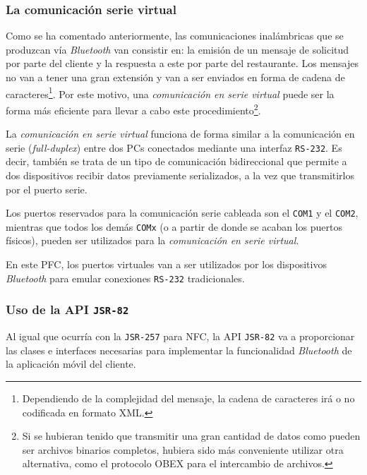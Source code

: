   \subsubsection{La comunicación serie virtual}
Como se ha comentado anteriormente, las comunicaciones inalámbricas que se 
produzcan vía \emph{Bluetooth} van consistir en: la emisión de un mensaje de 
solicitud por parte del cliente y la respuesta a este por parte del 
restaurante. Los mensajes no van a tener una gran extensión y van a ser 
enviados en forma de cadena de caracteres\footnote{Dependiendo de la 
complejidad del mensaje, la cadena de caracteres irá o no codificada en 
formato \acs{XML}.}. Por este motivo, una \emph{comunicación en serie virtual} 
puede ser la forma más eficiente para llevar a cabo este
procedimiento\footnote{Si se hubieran tenido que transmitir una gran cantidad
de datos como pueden ser archivos binarios completos, hubiera sido más 
conveniente utilizar otra alternativa, como el protocolo \acs{OBEX} para el 
intercambio de archivos.}.

La \emph{comunicación en serie virtual} funciona de forma similar a la
comunicación en serie (\emph{full-duplex}) entre dos PCs conectados 
mediante una interfaz \texttt{RS-232}. Es decir, también se trata de un
tipo de comunicación bidireccional que permite a dos dispositivos
recibir datos previamente serializados, a la vez que transmitirlos por el
puerto serie.

Los puertos reservados para la comunicación serie cableada son el \texttt{COM1}
y el \texttt{COM2}, mientras que todos los demás \texttt{COMx} (o a partir de
donde se acaban los puertos físicos), pueden ser utilizados para la 
\emph{comunicación en serie virtual}.

En este \acs{PFC}, los puertos virtuales van a ser utilizados por los
dispositivos \emph{Bluetooth} para emular conexiones \texttt{RS-232}
tradicionales.

  \subsubsection{Uso de la \acs{API} \texttt{\acs{JSR}-82}}
Al igual que ocurría con la \texttt{\acs{JSR}-257} para \acs{NFC}, la \acs{API}
\texttt{\acs{JSR}-82} va a proporcionar las clases e interfaces necesarias para
implementar la funcionalidad \emph{Bluetooth} de la aplicación móvil del
cliente.

